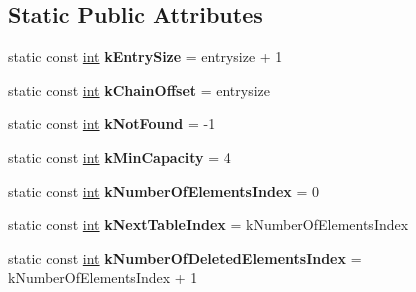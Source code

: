 \subsection*{Static Public Attributes}
\begin{DoxyCompactItemize}
\item 
\mbox{\label{classv8_1_1internal_1_1OrderedHashTable_a16f1e09d0f2c890fe7f5406d12c7f857}} 
static const \mbox{\hyperlink{classint}{int}} {\bfseries k\+Entry\+Size} = entrysize + 1
\item 
\mbox{\label{classv8_1_1internal_1_1OrderedHashTable_af295e80e248252431af41dc2779e238c}} 
static const \mbox{\hyperlink{classint}{int}} {\bfseries k\+Chain\+Offset} = entrysize
\item 
\mbox{\label{classv8_1_1internal_1_1OrderedHashTable_a3c9f8cb8ad41448ddd5729605c704c4c}} 
static const \mbox{\hyperlink{classint}{int}} {\bfseries k\+Not\+Found} = -\/1
\item 
\mbox{\label{classv8_1_1internal_1_1OrderedHashTable_a48c8e31a77a11344003756b87a6abecf}} 
static const \mbox{\hyperlink{classint}{int}} {\bfseries k\+Min\+Capacity} = 4
\item 
\mbox{\label{classv8_1_1internal_1_1OrderedHashTable_abab3e7e806091411f4ffed1e0fe37fd6}} 
static const \mbox{\hyperlink{classint}{int}} {\bfseries k\+Number\+Of\+Elements\+Index} = 0
\item 
\mbox{\label{classv8_1_1internal_1_1OrderedHashTable_afb6e8608a5db2d8add594913052a5600}} 
static const \mbox{\hyperlink{classint}{int}} {\bfseries k\+Next\+Table\+Index} = k\+Number\+Of\+Elements\+Index
\item 
\mbox{\label{classv8_1_1internal_1_1OrderedHashTable_acc91f5215d828608d9d1ea90fca8efd9}} 
static const \mbox{\hyperlink{classint}{int}} {\bfseries k\+Number\+Of\+Deleted\+Elements\+Index} = k\+Number\+Of\+Elements\+Index + 1
\item 
\mbox{\label{classv8_1_1internal_1_1OrderedHashTable_a239e9b9cecef739a22cfa12f096b6e9e}} 

\end{DoxyCompactItemize}
